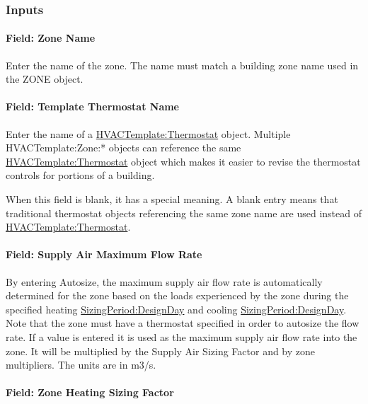 \subsubsection{Inputs}\label{inputs-3-018}

\paragraph{Field: Zone Name}\label{field-zone-name-2-002}

Enter the name of the zone. The name must match a building zone name used in the ZONE object.

\paragraph{Field: Template Thermostat Name}\label{field-template-thermostat-name-2}

Enter the name of a \hyperref[hvactemplatethermostat]{HVACTemplate:Thermostat} object. Multiple HVACTemplate:Zone:* objects can reference the same \hyperref[hvactemplatethermostat]{HVACTemplate:Thermostat} object which makes it easier to revise the thermostat controls for portions of a building.

When this field is blank, it has a special meaning. A blank entry means that traditional thermostat objects referencing the same zone name are used instead of \hyperref[hvactemplatethermostat]{HVACTemplate:Thermostat}.

\paragraph{Field: Supply Air Maximum Flow Rate}\label{field-supply-air-maximum-flow-rate}

By entering Autosize, the maximum supply air flow rate is automatically determined for the zone based on the loads experienced by the zone during the specified heating \hyperref[sizingperioddesignday]{SizingPeriod:DesignDay} and cooling \hyperref[sizingperioddesignday]{SizingPeriod:DesignDay}. Note that the zone must have a thermostat specified in order to autosize the flow rate. If a value is entered it is used as the maximum supply air flow rate into the zone. It will be multiplied by the Supply Air Sizing Factor and by zone multipliers. The units are in m3/s.

\paragraph{Field: Zone Heating Sizing Factor}\label{field-zone-heating-sizing-factor-1}

